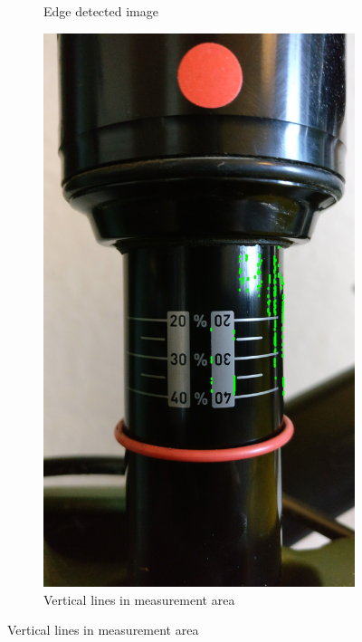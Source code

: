 \begin{figure}[h!]
\begin{subfigure}[t]{0.4\textwidth}
					\caption{Edge detected image}
					\label{subfig:edge_detect}
				\end{subfigure}
				\begin{subfigure}[t]{0.4\textwidth}
					\centering
					\includegraphics[scale=0.085,
									trim={40cm 35cm 10cm 50cm},
									clip]{../images/results/raw_lines.jpg}
					\caption{Vertical lines in measurement area}
					\label{subfig:lines}
				\end{subfigure}
			\end{figure}
